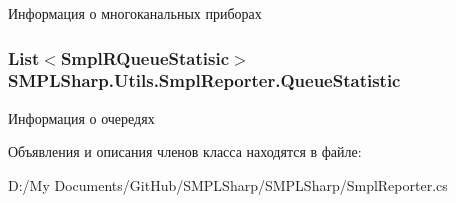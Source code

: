 Информация о многоканальных приборах 

\hypertarget{class_s_m_p_l_sharp_1_1_utils_1_1_smpl_reporter_a242251fbbe1facd190ed723f52285bfb}{
\subsubsection[{Queue\-Statistic}]{\setlength{\rightskip}{0pt plus 5cm}List$<${\bf Smpl\-R\-Queue\-Statisic}$>$ S\-M\-P\-L\-Sharp.\-Utils.\-Smpl\-Reporter.\-Queue\-Statistic\hspace{0.3cm}{\ttfamily [get]}}}\label{d2/d18/class_s_m_p_l_sharp_1_1_utils_1_1_smpl_reporter_a242251fbbe1facd190ed723f52285bfb}


Информация о очередях 



Объявления и описания членов класса находятся в файле\-:\begin{DoxyCompactItemize}
\item 
D\-:/\-My Documents/\-Git\-Hub/\-S\-M\-P\-L\-Sharp/\-S\-M\-P\-L\-Sharp/Smpl\-Reporter.\-cs\end{DoxyCompactItemize}

